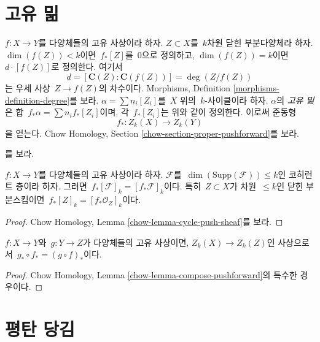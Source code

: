 \section{고유 밂}
\label{section-pushforward}

\noindent
$f : X \to Y$를 다양체들의 고유 사상이라 하자.
$Z \subset X$를\  $k$차원 닫힌 부분다양체라 하자.
$\dim(f(Z)) < k$이면\  $f_*[Z]$를\  $0$으로 정의하고,
$\dim(f(Z)) = k$이면\  $d \cdot [f(Z)]$로 정의한다. 여기서
$$
d = [\mathbf{C}(Z) : \mathbf{C}(f(Z))] = \deg(Z/f(Z))
$$
는 우세 사상\  $Z \to f(Z)$의 차수이다. Morphisms, Definition
\ref{morphisms-definition-degree}를 보라.
$\alpha = \sum n_i [Z_i]$를\  $X$ 위의\  $k$-사이클이라 하자.
$\alpha$의 {\it 고유 밂}은 합\  $f_* \alpha = \sum n_i f_*[Z_i]$이며,
각\  $f_*[Z_i]$는 위와 같이 정의한다. 이로써 준동형
$$
f_* : Z_k(X) \longrightarrow Z_k(Y)
$$
을 얻는다. Chow Homology, Section
\ref{chow-section-proper-pushforward}를 보라.

\begin{lemma}
\label{lemma-push-coherent}
\begin{reference}
\cite[Chapter V]{Serre_algebre_locale}를 보라.
\end{reference}
$f : X \to Y$를 다양체들의 고유 사상이라 하자.
$\mathcal{F}$를\  $\dim(\text{Supp}(\mathcal{F})) \leq k$인 코히런트
층이라 하자. 그러면\ 
$f_*[\mathcal{F}]_k = [f_*\mathcal{F}]_k$이다. 특히\ 
$Z \subset X$가 차원\  $\leq k$인 닫힌 부분스킴이면\ 
$f_*[Z]_k = [f_*\mathcal{O}_Z]_k$이다.
\end{lemma}

\begin{proof}
Chow Homology, Lemma \ref{chow-lemma-cycle-push-sheaf}를 보라.
\end{proof}

\begin{lemma}
\label{lemma-compose-pushforward}
$f : X \to Y$와\  $g : Y \to Z$가 다양체들의 고유 사상이면,
$Z_k(X) \to Z_k(Z)$인 사상으로서\ 
$g_* \circ f_* = (g \circ f)_*$이다.
\end{lemma}

\begin{proof}
Chow Homology, Lemma \ref{chow-lemma-compose-pushforward}의 특수한 경우이다.
\end{proof}



\section{평탄 당김}
\label{section-flat-pullback}

